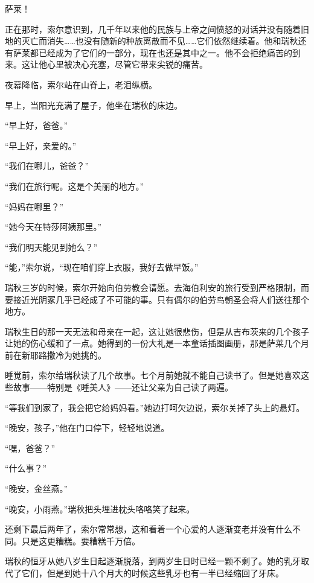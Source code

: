 \documentclass[AutoFakeBold=true]{book}
\begin{document}
{\kaishu 萨莱！}

正在那时，索尔意识到，几千年以来他的民族与上帝之间愤怒的对话并没有随着旧地的灭亡而消失……也没有随新的种族离散而不见……它们依然继续着。他和瑞秋还有萨莱都已经成为了它们的一部分，现在也还是其中之一。他不会拒绝痛苦的到来。这让他心里被决心充塞，尽管它带来尖锐的痛苦。

夜幕降临，索尔站在山脊上，老泪纵横。

早上，当阳光充满了屋子，他坐在瑞秋的床边。

``早上好，爸爸。''

``早上好，亲爱的。''

``我们在哪儿，爸爸？''

``我们在旅行呢。这是个美丽的地方。''

``妈妈在哪里？''

``她今天在特莎阿姨那里。''

``我们明天能见到她么？''

``能，''索尔说，``现在咱们穿上衣服，我好去做早饭。''

\vspace*{1em}

瑞秋三岁的时候，索尔开始向伯劳教会请愿。去海伯利安的旅行受到严格限制，而要接近光阴冢几乎已经成了不可能的事。只有偶尔的伯劳鸟朝圣会将人们送往那个地方。

瑞秋生日的那一天无法和母亲在一起，这让她很悲伤，但是从吉布茨来的几个孩子让她的伤心缓和了一点。她得到的一份大礼是一本童话插图画册，那是萨莱几个月前在新耶路撒冷为她挑的。

睡觉前，索尔给瑞秋读了几个故事。七个月前她就不能自己读书了。但是她喜欢这些故事——特别是《睡美人》——还让父亲为自己读了两遍。

``等我们到家了，我会把它给妈妈看。''她边打呵欠边说，索尔关掉了头上的悬灯。

``晚安，孩子，''他在门口停下，轻轻地说道。

``嘿，爸爸？''

``什么事？''

``晚安，金丝燕。''

``晚安，小雨燕。''瑞秋把头埋进枕头咯咯笑了起来。

\vspace*{1em}

还剩下最后两年了，索尔常常想，这和看着一个心爱的人逐渐变老并没有什么不同。只是这更糟糕。要糟糕千万倍。

瑞秋的恒牙从她八岁生日起逐渐脱落，到两岁生日时已经一颗不剩了。她的乳牙取代了它们，但是到她十八个月大的时候这些乳牙也有一半已经缩回了牙床。
\end{document}
